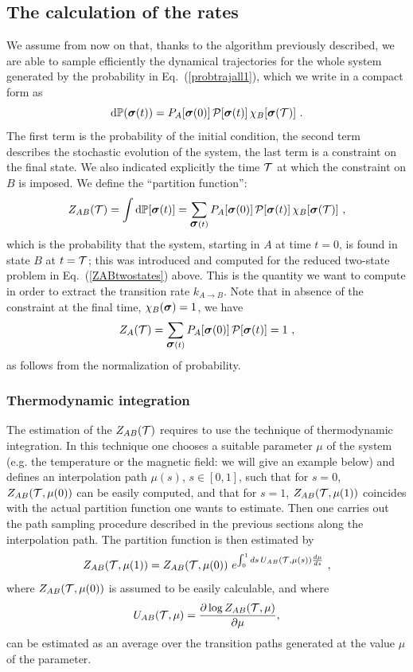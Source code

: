 \documentclass[aps,twocolumn,floats,pre,amsmath,superscriptaddress]{revtex4}
\newcommand{\beq}{\begin{equation}}
\newcommand{\eeq}{\end{equation}}
\def\PP{{\cal P}}\def\EE{{\cal E}}\def\MM{{\cal M}} \def\VV{{\cal V}}
\def\TT{{\cal T}}\def\NN{{\cal N}} \def\BB{{\cal B}}\def\II{{\cal I}}
\def\to{\rightarrow} \def\la{\langle} \def\ra{\rangle}
\newcommand{\<}{\langle}
\renewcommand{\>}{\rangle}
\newcommand{\bs}{ \mbox{\boldmath$\sigma$}}
\begin{document}

\subsection{The calculation of the rates}\label{ss_rates}

We assume from now on that, thanks to the algorithm previously described, we are able to sample
efficiently the dynamical trajectories for the whole system generated by the probability in Eq.~(\ref{probtrajall1}),
which we write in a compact form as
\beq\label{PAB}
\text{d}\mathbb{P}(\bs(t))= P_A[\bs(0)] \, \PP[\bs(t)] \, \chi_B[\bs(\TT)] \ .
\eeq
The first term is the probability of the initial condition, the second term describes the stochastic evolution of the system,
the last term is a constraint on the final state. We also indicated explicitly the time $\TT$ 
at which the constraint on $B$ is imposed.
We define the ``partition function'':
\beq
Z_{AB}(\TT) = \int \text{d}\mathbb{P}[\bs(t)] = \sum_{\bs(t)} P_A[\bs(0)] \, \PP[\bs(t)] \, \chi_B[\bs(\TT)] \ ,
\eeq
which is the probability that the system, starting in $A$ at time $t=0$, is found in state $B$ at $t=\TT$; this
was introduced and computed for the reduced two-state problem in Eq.~(\ref{ZABtwostates}) above. This is the quantity
we want to compute in order to extract the transition rate $k_{A\to B}$.
Note that in absence of the constraint at the final time, $\chi_B(\bs) =1$, we have
\beq
Z_{A}(\TT) = \sum_{\bs(t)} P_A[\bs(0)] \, \PP[\bs(t)] = 1 \ ,
\eeq
as follows from the normalization of probability. 


\subsubsection{Thermodynamic integration}\label{AppendixA}

The estimation of the $Z_{AB}(\TT)$
requires to use the technique of thermodynamic integration. 
In this technique one chooses a suitable parameter $\mu$ of the system
(e.g. the temperature or the magnetic field: we will give an example below)
and defines an interpolation path $\mu(s)$, $s\in [0,1]$, such
that for $s=0$, $Z_{AB}(\TT, \mu(0))$ can be easily computed, and
that for $s=1$,  $Z_{AB}(\TT, \mu(1))$ coincides with the actual partition function
one wants to estimate. 
Then one carries out the path sampling procedure described in the
previous sections along the interpolation path.
The partition function is then estimated by
\beq
Z_{AB}(\TT,\mu(1)) = Z_{AB}(\TT,\mu(0)) \, \, e^{\int_0^1 ds \, U_{AB}(\TT,\mu(s)) \frac{d\mu}{ds}} \ ,
\eeq
where
$Z_{AB}(\TT,\mu(0))$ is assumed to be 
easily calculable, and where
\beq
U_{AB}(\TT,\mu) = \frac{\partial \log Z_{AB}(\TT,\mu)}{\partial \mu},
\eeq
can be estimated as an average over the transition paths generated at the value $\mu$ of the parameter.
\end{document}
